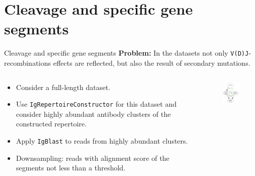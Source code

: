 \documentclass{beamer}\usepackage[]{graphicx}\usepackage[]{color}
\begin{document}
\section{Cleavage and specific gene segments}
\begin{frame}{Cleavage and specific gene segments}
  \textbf{Problem:} In the datasets not only \texttt{V(D)J}-recombinations effects are reflected, but also the result of secondary mutations.
 
  \pause
  \bigskip 
  \small{
  \begin{columns}[T]
    \begin{column}{0.6\textwidth}
      \begin{itemize}
        \item Consider a full-length dataset.
        \item Use \texttt{IgRepertoireConstructor} for this dataset and consider {\color{blue} highly abundant antibody clusters} of the constructed repertoire.
        \item Apply \texttt{IgBlast} to reads from highly abundant clusters.
        \item {\color{blue} Downsampling}:  reads with alignment score of the segments not less than a {\color{blue} threshold}.
      \end{itemize}
    \end{column}
    \begin{column}{0.5\textwidth}
      \begin{figure}[h]
        \includegraphics[width=120pt]{Pictures/downsampling.pdf}
      \end{figure}
    \end{column}
  \end{columns}
  }
\end{frame}
\end{document}
